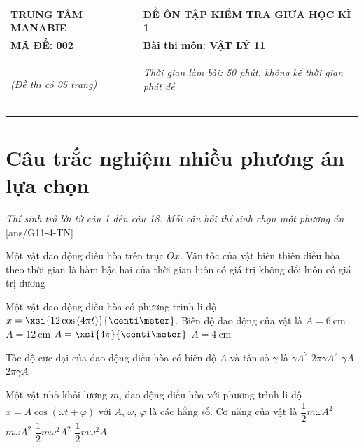 \begin{center}
	\begin{tabular}{M{6.5cm}M{11cm}}
		\textbf{TRUNG TÂM MANABIE}& \textbf{ĐỀ ÔN TẬP KIỂM TRA GIỮA HỌC KÌ 1}\\
		\textbf{MÃ ĐỀ: 002}& \textbf{Bài thi môn: VẬT LÝ 11}\\
		\textit{(Đề thi có 05 trang)}& \textit{Thời gian làm bài: 50 phút, không kể thời gian phát đề}
		
		\noindent\rule{4cm}{0.8pt} \\
	\end{tabular}
\end{center}
\setcounter{section}{0}
\section{Câu trắc nghiệm nhiều phương án lựa chọn}
\textit{Thí sinh trả lời từ câu 1 đến câu 18. Mỗi câu hỏi thí sinh chọn một phương án}
\setcounter{ex}{0}
[ans/G11-4-TN]
\begin{ex}
	Một vật dao động điều hòa trên trục $Ox$. Vận tốc của vật
	\choice
	{\True biến thiên điều hòa theo thời gian}
	{là hàm bậc hai của thời gian}
	{luôn có giá trị không đổi}
	{luôn có giá trị dương}
	\loigiai{}
\end{ex}
\begin{ex}
	Một vật dao động điều hòa có phương trình li độ $x=\xsi{12\cos\left(4\pi t\right)}{\centi\meter}$. Biên độ dao động của vật là	
	\choice
	{\True $A=\SI{6}{\centi\meter}$}
	{$A=\SI{12}{\centi\meter}$}
	{$A=\xsi{4\pi}{\centi\meter}$}
	{$A=\SI{4}{\centi\meter}$}
	\loigiai{}
\end{ex}
\begin{ex}
	Tốc độ cực đại của dao động điều hòa có biên độ $A$ và tần số $\gamma$ là 
	\choice
	{$\gamma A^2$}
	{$2\pi\gamma A^2$}
	{$\gamma A$}
	{\True $2\pi\gamma A$}
	\loigiai{}
\end{ex}
\begin{ex}
	Một vật nhỏ khối lượng $m$, dao động điều hòa với phương trình li độ $x=A\cos\left(\omega t+\varphi\right)$ với $A$, $\omega$, $\varphi$ là các hằng số. Cơ năng của vật là
	\choice
	{$\dfrac{1}{2}m\omega A^2$}
	{$m\omega A^2$}
	{\True $\dfrac{1}{2}m\omega^2 A^2$}
	{$\dfrac{1}{2}m\omega^2 A$}
	\loigiai{}
\end{ex}
